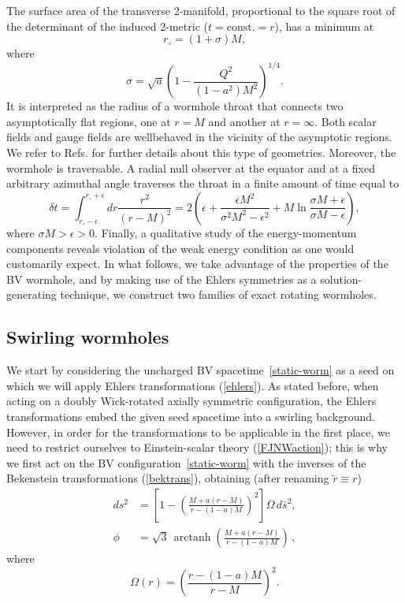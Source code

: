 \documentclass[aps,preprint,groupedaddress,nofootinbib,superscriptaddress,showkeys,showpacs,eqsecnum,amsmath,amssymb]{revtex4-1}
\DeclareMathOperator\arctanh{arctanh}
\begin{document}
The surface area of the transverse 2-manifold, proportional to the square root of the determinant of the induced 2-metric ($t=\mathrm{const.}=r$), has a minimum at
\begin{equation}
r_{\circ}=(1+\sigma)M,\label{eq:BVthroat}
\end{equation}
where 
\begin{equation}
    \sigma = \sqrt{a}\left(1 - \frac{Q^2}{(1-a^2)M^2}\right)^{1/4}.
\end{equation}
It is interpreted as the radius of a wormhole throat that connects two asymptotically flat regions, one at $r=M$ and another at $r=\infty$. Both scalar fields and gauge fields are wellbehaved in the vicinity of the asymptotic regions. We refer to  Refs. \cite{Barrientos:2022avi,Anabalon:2012tu} for further details about this type of geometries. Moreover, the wormhole is traversable. A radial null observer at the equator and at a fixed arbitrary azimuthal angle traverses the throat in a finite amount of time equal to
\begin{equation}
\delta t= \int_{r_\circ-\epsilon}^{r_\circ + \epsilon}dr \frac{r^2}{(r-M)^2} = 2\left( \epsilon + \frac{\epsilon M^2}{\sigma^2 M^2 - \epsilon^2}+M\ln \frac{\sigma M+\epsilon}{\sigma M -\epsilon}\right),\label{eq:travBVstatic}
\end{equation}
where $\sigma M > \epsilon >0$. Finally, a qualitative study of the energy-momentum components reveals violation of the weak energy condition as one would customarily expect. In what follows, we take advantage of the properties of the BV wormhole, and by making use of the Ehlers symmetries as a solution-generating technique, we construct two families of exact rotating wormholes. 

\subsection{Swirling wormholes}

We start by considering the uncharged BV spacetime~\eqref{static-worm} as a seed on which we will apply Ehlers transformations (\ref{ehlers}). As stated before, when acting on a doubly Wick-rotated axially symmetric configuration, the Ehlers transformations embed the given seed spacetime into a swirling background. However, in order for the transformations to be applicable in the first place, we need to restrict ourselves to Einstein-scalar theory (\ref{FJNWaction}); this is why we first act on the BV configuration~\eqref{static-worm} with the inverses of the Bekenstein transformations (\ref{bektrans}), obtaining (after renaming $\tilde{r}\equiv r$)
\begin{subequations}
\begin{align}
ds^2 &=\left[1 - \left(\frac{M + a(r-M)}{r-(1-a)M}\right)^2\right] \Omega\,
d\bar{s}^2, \\ 
\phi &= \sqrt{3} \, \arctanh\left(\frac{M + a(r-M)}{r-(1-a)M}\right) \,,
\end{align}\label{BVEF} 
\end{subequations}
where 
\begin{equation}
    \Omega(r)=\left( \frac{r-(1-a)M}{r-M}\right)^2.\label{eq:Omega}
\end{equation}
\end{document}
